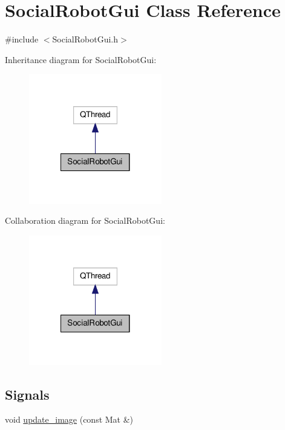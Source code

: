 \hypertarget{classSocialRobotGui}{\section{Social\-Robot\-Gui Class Reference}
\label{classSocialRobotGui}
}


{\ttfamily \#include $<$Social\-Robot\-Gui.\-h$>$}



Inheritance diagram for Social\-Robot\-Gui\-:
\nopagebreak
\begin{figure}[H]
\begin{center}
\leavevmode
\includegraphics[width=164pt]{classSocialRobotGui__inherit__graph}
\end{center}
\end{figure}


Collaboration diagram for Social\-Robot\-Gui\-:
\nopagebreak
\begin{figure}[H]
\begin{center}
\leavevmode
\includegraphics[width=164pt]{classSocialRobotGui__coll__graph}
\end{center}
\end{figure}
\subsection*{Signals}
\begin{DoxyCompactItemize}
\item 
void \hyperlink{classSocialRobotGui_aba07bb0bb3b8fa3f317539e9d6698aee}{update\-\_\-image} (const Mat \&)
\end{DoxyCompactItemize}
